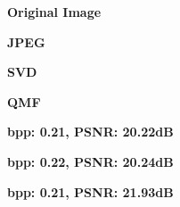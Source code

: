 \begin{figure*}[!t]
    \captionsetup[subfigure]{labelformat=empty,aboveskip=1pt,belowskip=6pt}
    \centering

    \begin{subfigure}[t]{0.25\textwidth}
        \centering
        \textbf{Original Image}
    \end{subfigure}%
    \begin{subfigure}[t]{0.25\textwidth}
        \centering
        \textbf{JPEG}
    \end{subfigure}%
    \begin{subfigure}[t]{0.25\textwidth}
        \centering
        \textbf{SVD}
    \end{subfigure}%
    \begin{subfigure}[t]{0.25\textwidth}
        \centering
        \textbf{QMF}
    \end{subfigure}

    \begin{subfigure}[t]{0.25\textwidth}
        \centering
    \end{subfigure}%
    \begin{subfigure}[t]{0.25\textwidth}
        \centering
        \caption{\scriptsize\textbf{bpp: 0.21, PSNR: 20.22dB}}
    \end{subfigure}%
    \begin{subfigure}[t]{0.25\textwidth}
        \centering
        \caption{\scriptsize\textbf{bpp: 0.22, PSNR: 20.24dB}}
    \end{subfigure}%
    \begin{subfigure}[t]{0.25\textwidth}
        \centering
        \caption{\scriptsize\textbf{bpp: 0.21, PSNR: 21.93dB}}
    \end{subfigure}


\end{figure*}
